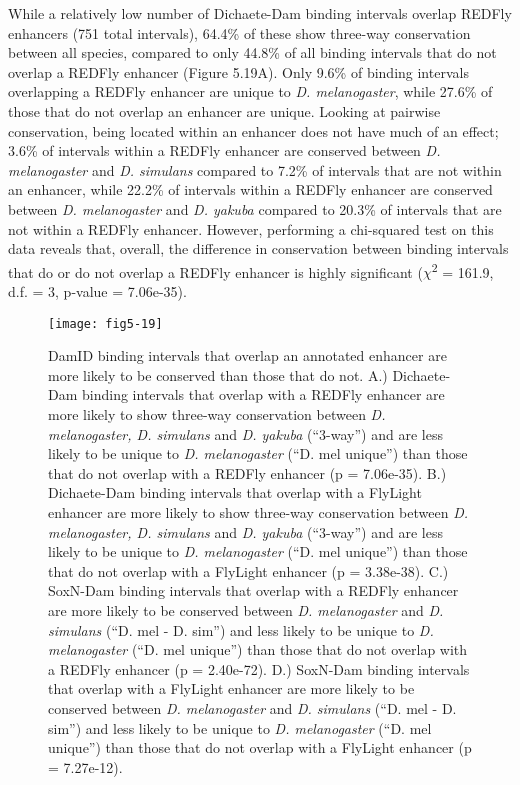 While a relatively low number of Dichaete-Dam binding intervals overlap REDFly enhancers (751 total intervals), 64.4\% of these show three-way conservation between all species, compared to only 44.8\% of all binding intervals that do not overlap a REDFly enhancer (Figure 5.19A). Only 9.6\% of binding intervals overlapping a REDFly enhancer are unique to \emph{D. melanogaster}, while 27.6\% of those that do not overlap an enhancer are unique. Looking at pairwise conservation, being located within an enhancer does not have much of an effect; 3.6\% of intervals within a REDFly enhancer are conserved between \emph{D. melanogaster} and \emph{D. simulans} compared to 7.2\% of intervals that are not within an enhancer, while 22.2\% of intervals within a REDFly enhancer are conserved between \emph{D. melanogaster} and \emph{D. yakuba} compared to 20.3\% of intervals that are not within a REDFly enhancer. However, performing a chi-squared test on this data reveals that, overall, the difference in conservation between binding intervals that do or do not overlap a REDFly enhancer is highly significant (\(\chi\)\textsuperscript{2} = 161.9, d.f. = 3, p-value = 7.06e-35).\\

\begin{figure}
\centering
\texttt{[image: fig5-19]}
\caption{DamID binding intervals that overlap an annotated enhancer are more likely to be conserved than those that do not. A.) Dichaete-Dam binding intervals that overlap with a REDFly enhancer are more likely to show three-way conservation between \emph{D. melanogaster, D. simulans} and \emph{D. yakuba} (“3-way”) and are less likely to be unique to \emph{D. melanogaster}  (“D. mel unique”) than those that do not overlap with a REDFly enhancer (p = 7.06e-35).  B.) Dichaete-Dam binding intervals that overlap with a FlyLight enhancer are more likely to show three-way conservation between \emph{D. melanogaster, D. simulans} and \emph{D. yakuba} (“3-way”) and are less likely to be unique to \emph{D. melanogaster}  (“D. mel unique”) than those that do not overlap with a FlyLight enhancer (p = 3.38e-38). C.) SoxN-Dam binding intervals that overlap with a REDFly enhancer are more likely to be conserved between \emph{D. melanogaster} and \emph{D. simulans} (“D. mel - D. sim”) and less likely to be unique to \emph{D. melanogaster} (“D. mel unique”) than those that do not overlap with a REDFly enhancer (p = 2.40e-72). D.) SoxN-Dam binding intervals that overlap with a FlyLight enhancer are more likely to be conserved between \emph{D. melanogaster} and \emph{D. simulans} (“D. mel - D. sim”) and less likely to be unique to \emph{D. melanogaster} (“D. mel unique”) than those that do not overlap with a FlyLight enhancer (p = 7.27e-12).}
\label{Figure 5.19}
\end{figure}
 
